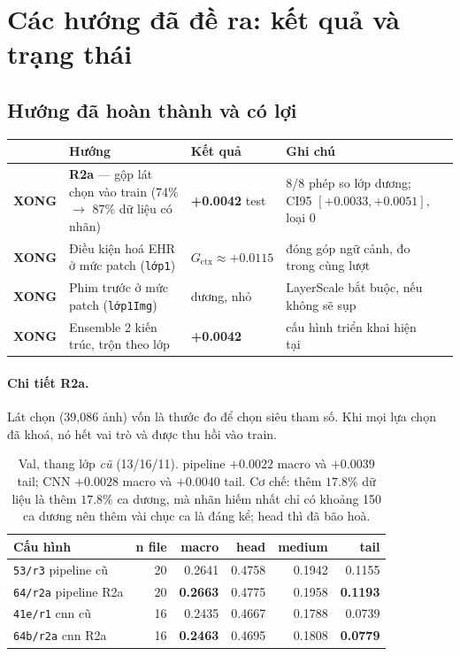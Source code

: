\documentclass[11pt,a4paper]{article}
\newcommand{\XONG}{\textbf{\textcolor{blue!58!black}{XONG}}}
\newcommand{\code}[1]{\texttt{\small #1}}
\begin{document}
\section{Các hướng đã đề ra: kết quả và trạng thái}

\subsection{Hướng đã hoàn thành và có lợi}

\begin{table}[h]
\centering
\small
\begin{tabular}{@{}l p{4.0cm}ll p{4.6cm}@{}}
\toprule
& \textbf{Hướng} & \textbf{Kết quả} & \textbf{Ghi chú} \\
\midrule
\XONG &
\textbf{R2a} --- gộp lát chọn vào train (74\% $\to$ 87\% dữ liệu có nhãn)
 & \textbf{+0.0042} test & 8/8 phép so lớp dương; CI95 $[+0.0033, +0.0051]$, loại 0 \\
\addlinespace
\XONG & Điều kiện hoá EHR ở mức patch (\code{lớp1})
 & $G_{\text{ctx}} \approx +0.0115$ & đóng góp ngữ cảnh, đo trong cùng lượt \\
\addlinespace
\XONG & Phim trước ở mức patch (\code{lớp1Img})
 & dương, nhỏ & LayerScale bắt buộc, nếu không sẽ sụp \\
\addlinespace
\XONG & Ensemble 2 kiến trúc, trộn theo lớp
 & \textbf{+0.0042} & cấu hình triển khai hiện tại \\
\bottomrule
\end{tabular}
\end{table}

\paragraph{Chi tiết R2a.} Lát chọn (39{,}086 ảnh) vốn là thước đo để chọn siêu tham số.
Khi mọi lựa chọn đã khoá, nó hết vai trò và được thu hồi vào train.

\begin{table}[h]
\centering
\small
\begin{tabular}{@{}lrrrrr@{}}
\toprule
\textbf{Cấu hình} & \textbf{n file} & \textbf{macro} & \textbf{head} & \textbf{medium} & \textbf{tail} \\
\midrule
\code{53/r3} pipeline cũ   & 20 & 0.2641 & 0.4758 & 0.1942 & 0.1155 \\
\code{64/r2a} pipeline R2a & 20 & \textbf{0.2663} & 0.4775 & 0.1958 & \textbf{0.1193} \\
\code{41e/r1} cnn cũ        & 16 & 0.2435 & 0.4667 & 0.1788 & 0.0739 \\
\code{64b/r2a} cnn R2a      & 16 & \textbf{0.2463} & 0.4695 & 0.1808 & \textbf{0.0779} \\
\bottomrule
\end{tabular}
\caption{Val, thang lớp \emph{cũ} (13/16/11). pipeline $+0.0022$ macro và $+0.0039$ tail;
CNN $+0.0028$ macro và $+0.0040$ tail. Cơ chế: thêm $17.8\%$ dữ liệu là thêm $17.8\%$ ca
dương, mà nhãn hiếm nhất chỉ có khoảng 150 ca dương nên thêm vài chục ca là đáng kể;
head thì đã bão hoà.}
\end{table}
\end{document}

